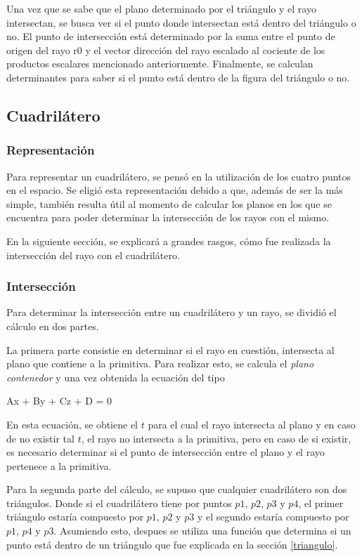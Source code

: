 \documentclass[a4paper,10pt]{article}
\begin{document}
Una vez que se sabe que el plano determinado por el tri\'angulo y el rayo intersectan, se busca ver si el punto donde intersectan est\'a dentro
del tri\'angulo o no. El punto de intersecci\'on est\'a determinado por la suma entre el punto de origen del rayo r0 y el vector direcci\'on del rayo
escalado al cociente de los productos escalares mencionado anteriormente. Finalmente, se calculan determinantes para saber si el punto est\'a dentro
de la figura del tri\'angulo o no.


\subsection{Cuadril\'atero}

\subsubsection{Representaci\'on}
Para representar un cuadril\'atero, se pens\'o en la utilizaci\'on de los cuatro puntos en el espacio.  Se eligi\'o esta representaci\'on debido a que, adem\'as de ser la m\'as simple, tambi\'en resulta \'util al momento de calcular los planos en los que se encuentra para poder determinar la intersecci\'on de los rayos con el mismo.

En la siguiente secci\'on, se explicar\'a a grandes rasgos, c\'omo fue realizada la intersecci\'on del rayo con el cuadril\'atero.
\subsubsection{Intersecci\'on}
Para determinar la intersecci\'on entre un cuadril\'atero y un rayo, se dividi\'o el c\'alculo en dos partes.

La primera parte consistie en determinar si el rayo en cuesti\'on, intersecta al plano que contiene a la primitiva.  Para realizar esto, se calcula el \emph{plano contenedor} y una vez obtenida la ecuaci\'on del tipo

 \begin{center}
 Ax + By + Cz + D = 0
\end{center}

En esta ecuaci\'on, se obtiene el $t$ para el cual el rayo intersecta al plano y en caso de no existir tal $t$, el rayo no intersecta a la primitiva, pero en caso de si existir, es necesario determinar si el punto de intersecci\'on entre el plano y el rayo pertenece a la primitiva.

Para la segunda parte del c\'alculo, se supuso que cualquier cuadril\'atero son dos tri\'angulos.  Donde si el cuadril\'atero tiene por puntos $p1$, $p2$, $p3$ y $p4$, el primer tri\'angulo estar\'ia compuesto por $p1$, $p2$ y $p3$ y el segundo estar\'ia compuesto por $p1$, $p4$ y $p3$.
Asumiendo esto, despues se utiliza una funci\'on que determina si un punto est\'a dentro de un tri\'angulo que fue explicada en la secci\'on \ref{triangulo}.
\end{document}
